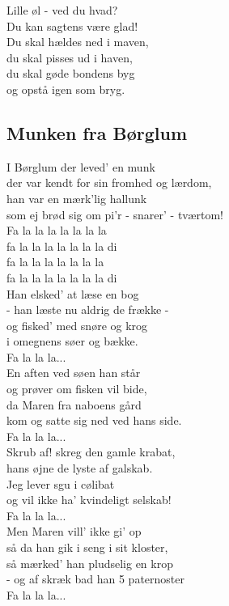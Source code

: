 Lille øl - ved du hvad?\\
Du kan sagtens være glad!\\ 
Du skal hældes ned i maven,\\ 
du skal pisses ud i haven,\\
du skal gøde bondens byg\\
og opstå igen som bryg.\\

\subsection*{Munken fra Børglum}

I Børglum der leved' en munk\\
der var kendt for sin fromhed og lærdom,\\
han var en mærk'lig hallunk\\
som ej brød sig om pi'r - snarer' - tværtom!\\
Fa la la la la la la la\\
fa la la la la la la la di\\
fa la la la la la la la\\
fa la la la la la la la di\\
 
Han elsked' at læse en bog\\
- han læste nu aldrig de frække -\\
og fisked' med snøre og krog\\
i omegnens søer og bække.\\
Fa la la la...\\
 
En aften ved søen han står\\
og prøver om fisken vil bide,\\
da Maren fra naboens gård\\
kom og satte sig ned ved hans side.\\
Fa la la la...\\
 
Skrub af! skreg den gamle krabat,\\
hans øjne de lyste af galskab.\\
Jeg lever sgu i cølibat\\
og vil ikke ha' kvindeligt selskab!\\
Fa la la la...\\
 
Men Maren vill' ikke gi' op\\
så da han gik i seng i sit kloster,\\
så mærked' han pludselig en krop\\
- og af skræk bad han 5 paternoster\\
Fa la la la...\\
 

